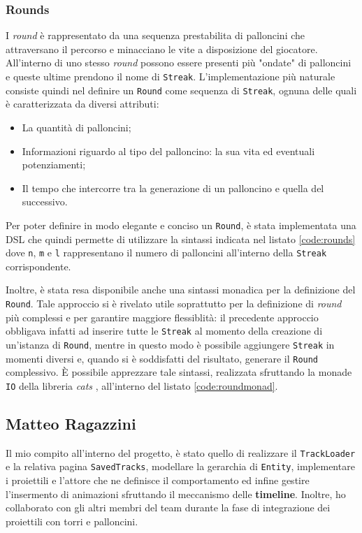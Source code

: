 \subsubsection{Rounds}
I \textit{round} è rappresentato da una sequenza prestabilita di palloncini che attraversano il percorso e minacciano le
vite a disposizione del giocatore. All'interno di uno stesso \textit{round} possono essere presenti più "ondate" di
palloncini e queste ultime prendono il nome di \texttt{Streak}. L'implementazione più naturale consiste quindi nel
definire un \texttt{Round} come sequenza di \texttt{Streak}, ognuna delle quali è caratterizzata da diversi attributi:
\begin{itemize}
    \item La quantità di palloncini;
    \item Informazioni riguardo al tipo del palloncino: la sua vita ed eventuali potenziamenti;
    \item Il tempo che intercorre tra la generazione di un palloncino e quella del successivo.
\end{itemize}

Per poter definire in modo elegante e conciso un \texttt{Round}, è stata implementata una DSL che quindi permette di
utilizzare la sintassi indicata nel listato \ref{code:rounds} dove \texttt{n}, \texttt{m} e \texttt{l} rappresentano il
numero di palloncini all'interno della \texttt{Streak} corrispondente.


Inoltre, è stata resa disponibile anche una sintassi monadica per la definizione del \texttt{Round}. Tale approccio si è
rivelato utile soprattutto per la definizione di \textit{round} più complessi e per garantire maggiore flessiblità: il
precedente approccio obbligava infatti ad inserire tutte le \texttt{Streak} al momento della creazione di un'istanza di
\texttt{Round}, mentre in questo modo è possibile aggiungere \texttt{Streak} in momenti diversi e, quando si è
soddisfatti del risultato, generare il \texttt{Round} complessivo. È possibile apprezzare tale sintassi, realizzata
sfruttando la monade \texttt{IO} della libreria \textit{cats} \cite{cats-effects}, all'interno del listato
\ref{code:roundmonad}.


\subsection{Matteo Ragazzini}\label{subsec:matteo-ragazzini}
Il mio compito all'interno del progetto, è stato quello di realizzare il \texttt{TrackLoader} e la relativa pagina
\texttt{SavedTracks}, modellare la gerarchia di \texttt{Entity},  implementare i proiettili e l'attore che
ne definisce il comportamento ed infine gestire l'insermento di animazioni sfruttando il meccanismo delle \textbf{timeline}.
Inoltre, ho collaborato con gli altri membri del team durante la fase di integrazione dei proiettili con torri e palloncini.


